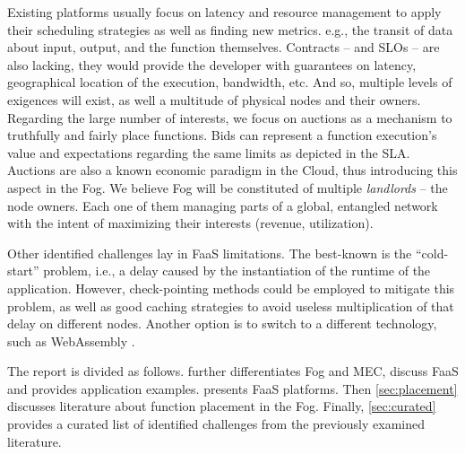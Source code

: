 \documentclass[11pt]{sdm}
\begin{document}
Existing platforms usually focus on latency and resource management to apply their scheduling strategies as well as finding new metrics. e.g., the transit of data about input, output, and the function themselves. Contracts --  and \glspl{SLO} -- are also lacking, they would provide the developer with guarantees on latency, geographical location of the execution, bandwidth, etc. And so, multiple levels of exigences will exist, as well a multitude of physical nodes and their owners. Regarding the large number of interests, we focus on auctions as a mechanism to truthfully and fairly place functions. Bids can represent a function execution's value and expectations regarding the same limits as depicted in the \gls{SLA}. Auctions are also a known economic paradigm in the Cloud, thus introducing this aspect in the Fog. We believe Fog will be constituted of multiple \emph{landlords} -- the node owners. Each one of them managing parts of a global, entangled network with the intent of maximizing their interests (revenue, utilization).


Other identified challenges lay in \gls{FaaS} limitations. The best-known is the ``cold-start'' problem, i.e., a delay caused by the instantiation of the runtime of the application. However, check-pointing methods could be employed to mitigate this problem, as well as good caching strategies to avoid useless multiplication of that delay on different nodes. Another option is to switch to a different technology, such as WebAssembly \cite{hykes_solomon_2019}.

The report is divided as follows.  further differentiates Fog and \gls{MEC}, discuss \gls{FaaS} and provides application examples.  presents \gls{FaaS} platforms. Then \cref{sec:placement} discusses literature about function placement in the Fog. Finally, \cref{sec:curated} provides a curated list of identified challenges from the previously examined literature.

\end{document}
